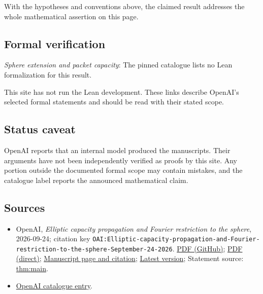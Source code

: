 \documentclass[11pt]{article}
\begin{document}
With the hypotheses and conventions above, the claimed result addresses the whole mathematical assertion on this page.

\subsection{Formal verification}
\textit{Sphere extension and packet capacity}: The pinned catalogue lists no Lean formalization for this result.

This site has not run the Lean development. These links describe OpenAI’s selected formal statements and should be read with their stated scope.

\subsection{Status caveat}
OpenAI reports that an internal model produced the manuscripts. Their arguments have not been independently verified as proofs by this site. Any portion outside the documented formal scope may contain mistakes, and the catalogue label reports the announced mathematical claim.

\subsection{Sources}
\begin{itemize}
\item OpenAI, \emph{Elliptic capacity propagation and Fourier restriction to the sphere}, 2026-09-24; citation key \texttt{OAI:Elliptic-capacity-propagation-and-Fourier-restriction-to-the-sphere-September-24-2026}. \href{https://github.com/openai/math/blob/adc7f1241b42e322a6451854ab7e4b4c146bf78a/preprints/Elliptic-capacity-propagation-and-Fourier-restriction-to-the-sphere-September-24-2026/Elliptic-capacity-propagation-and-Fourier-restriction-to-the-sphere-September-24-2026.pdf}{PDF (GitHub)}; \href{https://github.com/openai/math/raw/adc7f1241b42e322a6451854ab7e4b4c146bf78a/preprints/Elliptic-capacity-propagation-and-Fourier-restriction-to-the-sphere-September-24-2026/Elliptic-capacity-propagation-and-Fourier-restriction-to-the-sphere-September-24-2026.pdf}{PDF (direct)}; \href{https://github.com/openai/math/blob/adc7f1241b42e322a6451854ab7e4b4c146bf78a/preprints/Elliptic-capacity-propagation-and-Fourier-restriction-to-the-sphere-September-24-2026/README.md}{Manuscript page and citation}; \href{https://github.com/openai/math/blob/main/preprints/Elliptic-capacity-propagation-and-Fourier-restriction-to-the-sphere-September-24-2026/Elliptic-capacity-propagation-and-Fourier-restriction-to-the-sphere-September-24-2026.pdf}{Latest version}; Statement source: \href{https://github.com/openai/math/blob/adc7f1241b42e322a6451854ab7e4b4c146bf78a/preprints/Elliptic-capacity-propagation-and-Fourier-restriction-to-the-sphere-September-24-2026/build/sections/00-introduction.tex\#L21}{thm:main}.
\item \href{https://github.com/openai/math/blob/adc7f1241b42e322a6451854ab7e4b4c146bf78a/CONTENTS.md}{OpenAI catalogue entry}.
\end{itemize}
\end{document}
